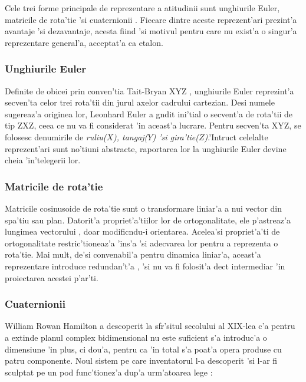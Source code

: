 \documentclass[12pt,a4paper,twoside]{report}
\begin{document}
\vspace{5px}

Cele trei forme principale de reprezentare a atitudinii sunt unghiurile Euler, matricile de rota'tie 'si cuaternionii \cite{article3}. Fiecare dintre aceste reprezent'ari prezint'a avantaje 'si dezavantaje, acesta fiind 'si motivul pentru care nu exist'a o singur'a reprezentare general'a, acceptat'a ca etalon. 

\subsubsection{Unghiurile Euler}

Definite de obicei prin conven'tia Tait-Bryan XYZ \cite{article3}, unghiurile Euler reprezint'a secven'ta celor trei rota'tii din jurul axelor cadrului cartezian. Desi numele sugereaz'a originea lor, Leonhard Euler a g\ia ndit ini'tial o secvent'a de rota'tii de tip ZXZ, ceea ce nu va fi considerat 'in aceast'a lucrare. Pentru secven'ta XYZ, se folosesc denumirile de \textit{ruliu($X$), tangaj($Y$) 'si gira'tie($Z$)}.'Intruc\ia t celelalte reprezent'ari sunt no'tiuni abstracte, raportarea lor la unghiurile Euler devine cheia 'in'telegerii lor.

\subsubsection{Matricile de rota'tie}

Matricile cosinusoide de rota'tie sunt o transformare liniar'a a nui vector din spa'tiu sau plan. Datorit'a propriet'a'tiilor lor de ortogonalitate, ele p'astreaz'a lungimea vectorului \cite{article3}, doar modific\ia ndu-i orientarea. Acelea'si propriet'a'ti de ortogonalitate restric'tioneaz'a 'ins'a 'si adecvarea lor pentru a reprezenta o rota'tie. Mai mult, de'si convenabil'a pentru dinamica liniar'a, aceast'a reprezentare introduce redundan't'a \cite{Jia2015QuaternionsAR}, 'si nu va fi folosit'a dec\ia t intermediar 'in proiectarea acestei p'ar'ti.

\subsubsection{Cuaternionii}

William Rowan Hamilton a descoperit la sf\ia r'situl secolului al XIX-lea c'a pentru a extinde planul complex bidimensional nu este suficient s'a introduc'a o dimensiune 'in plus, ci dou'a, pentru ca 'in total s'a poat'a opera produse cu patru componente. Noul sistem pe care inventatorul l-a descoperit 'si l-ar fi sculptat pe un pod func'tionez'a dup'a urm'atoarea lege \cite{Jia2015QuaternionsAR}:
\end{document}

